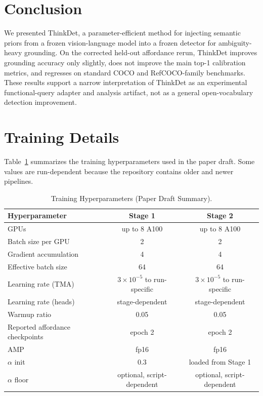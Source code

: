 \documentclass{uai2026} %
\begin{document}
\section{Conclusion}\label{sec:conclusion}
We presented ThinkDet, a parameter-efficient method for injecting semantic
priors from a frozen vision-language model into a frozen detector for
ambiguity-heavy grounding. On the corrected held-out affordance rerun,
ThinkDet improves grounding accuracy only slightly, does not improve the main
top-1 calibration metrics, and regresses on standard COCO and RefCOCO-family
benchmarks. These results support a narrow interpretation of ThinkDet as an
experimental functional-query adapter and analysis artifact, not as a general
open-vocabulary detection improvement.



\newpage
\onecolumn
\appendix

\section{Training Details}\label{app:train}
Table~\ref{tab:train-details} summarizes the training hyperparameters used in the paper draft. Some values are run-dependent because the repository contains older and newer pipelines.

\begin{table}[h]
\centering
\caption{Training Hyperparameters (Paper Draft Summary).}
\label{tab:train-details}
\begin{tabular}{lcc}
\toprule
Hyperparameter & Stage 1 & Stage 2 \\
\midrule
GPUs & up to 8 A100 & up to 8 A100 \\
Batch size per GPU & 2 & 2 \\
Gradient accumulation & 4 & 4 \\
Effective batch size & 64 & 64 \\
Learning rate (TMA) & \(3\times 10^{-5}\) to run-specific & \(3\times 10^{-5}\) to run-specific \\
Learning rate (heads) & stage-dependent & stage-dependent \\
Warmup ratio & 0.05 & 0.05 \\
Reported affordance checkpoints & epoch 2 & epoch 2 \\
AMP & fp16 & fp16 \\
\(\alpha\) init & 0.3 & loaded from Stage 1 \\
\(\alpha\) floor & optional, script-dependent & optional, script-dependent \\
\bottomrule
\end{tabular}
\end{table}
\end{document}
